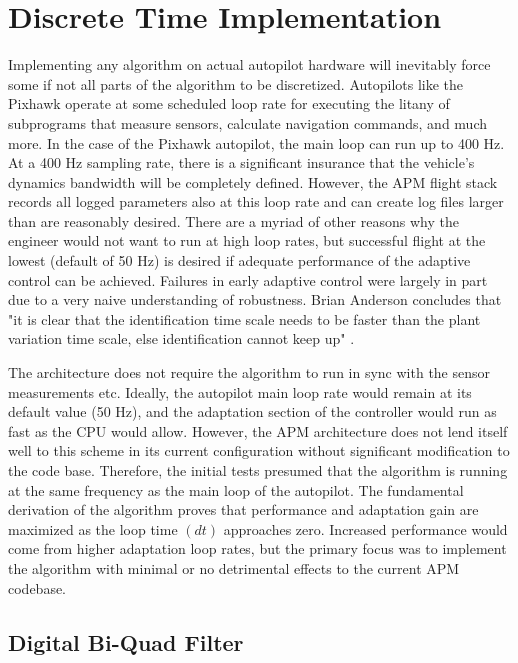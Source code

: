 \section{\Lone Discrete Time Implementation}
Implementing any algorithm on actual autopilot hardware will inevitably force some if not all parts of the algorithm to be discretized.  Autopilots like the Pixhawk operate at some scheduled loop rate for executing the litany of subprograms that measure sensors, calculate navigation commands, and much more.  In the case of the Pixhawk autopilot, the main loop can run up to 400 Hz.  At a 400 Hz sampling rate, there is a significant insurance that the vehicle's dynamics bandwidth will be completely defined.  However, the \ac{APM} flight stack records all logged parameters also at this loop rate and can create log files larger than are reasonably desired.  There are a myriad of other reasons why the engineer would not want to run at high loop rates, but successful flight at the lowest (default of 50 Hz) is desired if adequate performance of the adaptive control can be achieved.  Failures in early adaptive control were largely in part due to a very naive understanding of robustness.  Brian Anderson concludes that "it is clear that the identification time scale needs to be faster than the plant variation time scale, else identification cannot keep up" \cite{anderson2005failures}.  

The \Lone architecture does not require the algorithm to run in sync with the sensor measurements etc.  Ideally, the autopilot main loop rate would remain at its default value (50 Hz), and the adaptation section of the \Lone controller would run as fast as the CPU would allow.  However, the \ac{APM} architecture does not lend itself well to this scheme in its current configuration without significant modification to the code base.  Therefore, the initial tests presumed that the \Lone algorithm is running at the same frequency as the main loop of the autopilot.  The fundamental derivation of the \Lone algorithm proves that performance and adaptation gain are maximized as the loop time $(dt)$ approaches zero.  Increased performance would come from higher adaptation loop rates, but the primary focus was to implement the \Lone algorithm with minimal or no detrimental effects to the current \ac{APM} codebase.

\subsection{Digital Bi-Quad Filter}

